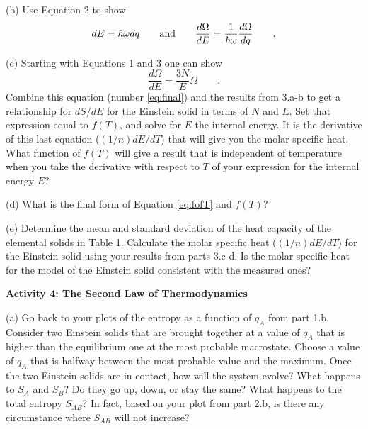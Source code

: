 (b) Use Equation 2 to show 
\begin{equation}
dE = \hbar \omega dq \qquad {\rm and} \qquad  
    \frac{d\Omega}{dE}=\frac{1}{\hbar\omega} \frac{d\Omega}{dq}
\qquad .
\end{equation}
\vspace{15mm}

(c) Starting with Equations 1 and 3 one can show
\begin{equation}\label{eq:final}
\frac{d\Omega}{dE} = \frac{3N}{E} \Omega
\qquad .
\end{equation}
Combine this equation (number \ref{eq:final}) and the  results from 3.a-b to 
get a relationship for $dS/dE$ for the Einstein solid in terms
of $N$ and $E$.
Set that expression equal to $f(T)$,
and solve for $E$ the internal energy.
It is the derivative of this last equation ($(1/n)dE/dT$) that will give you the molar specific heat.
What function of $f(T)$ will give a result that is independent of temperature when you
take the derivative with respect to $T$ of your expression for the internal energy $E$?
\vspace{45mm}

(d)  What is the final form of Equation \ref{eq:fofT} and $f(T)$?
\vspace{15mm}

\newpage

(e) Determine the mean and standard deviation of the heat capacity of the elemental solids in
Table 1.
Calculate the molar specific heat ($(1/n)dE/dT$) for the Einstein solid using your results from
parts 3.c-d.
Is the molar specific heat for the model of the Einstein solid consistent with the measured ones?
\vspace{45mm}


\textbf{Activity 4: The Second Law of Thermodynamics}

(a) Go back to your plots of the entropy as a function of $q_A$ from part 1.b. 
Consider two Einstein solids that are brought together at a value of $q_A$ that is higher
than the equilibrium one at the most probable macrostate.
Choose a value of $q_A$ that is halfway between the most probable value and the maximum.
Once the two Einstein solids are in contact, how will the system evolve?
What happens to $S_A$ and $S_B$? Do they go up, down, or stay the same?
What happens to the total entropy $S_{AB}$?
In fact, based on your plot from part 2.b, is there any circumstance where
$S_{AB}$ will not increase?
\vspace{30mm}

